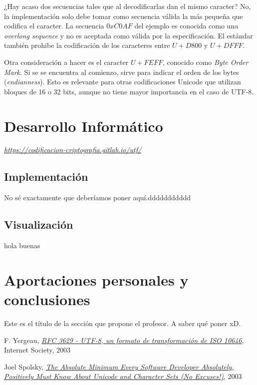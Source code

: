 \documentclass{article}
\begin{document}
¿Hay acaso dos secuencias tales que al decodificarlas dan el mismo caracter? No, la implementación solo debe tomar como secuencia válida la más pequeña que codifica el caracter. La secuencia $0xC0AF$ del ejemplo es conocida como una \textit{overlong sequence} y no es aceptada como válida por la especificación.
El estándar también prohibe la codificación de los caracteres entre $U+D800$ y $U+DFFF$.

Otra consideración a hacer es el caracter $U+FEFF$, conocido como \textit{Byte Order Mark}. Si se se encuentra al comienzo, sirve para indicar el orden de los bytes (\textit{endianness}). Esto es relevante para otras codificaciones Unicode que utilizan bloques de 16 o 32 bits, aunque no tiene mayor importancia en el caso de UTF-8.

\section{Desarrollo Informático}
\href{https://codificacion-criptografia.gitlab.io/utf/}{\textit{https://codificacion-criptografia.gitlab.io/utf/}}

\subsection{Implementación}
No sé exactamente que deberíamos poner aquí.ddddddddddd

\subsection{Visualización}
hola buenas

\section{Aportaciones personales y conclusiones}
Este es el título de la sección que propone el profesor. A saber qué poner xD.

\begin{thebibliography}{9}

  F. Yergeau,
  \href{https://tools.ietf.org/html/rfc3629}{\textit{RFC 3629 - UTF-8, un formato de transformación de ISO 10646}},
  Internet Society, 2003

  Joel Spolsky,
  \href{https://www.joelonsoftware.com/2003/10/08/the-absolute-minimum-every-software-developer-absolutely-positively-must-know-about-unicode-and-character-sets-no-excuses/}{\textit{The Absolute Minimum Every Software Developer Absolutely, Positively Must Know About Unicode and Character Sets (No Excuses!)}},
  2003

\end{thebibliography}
\end{document}
